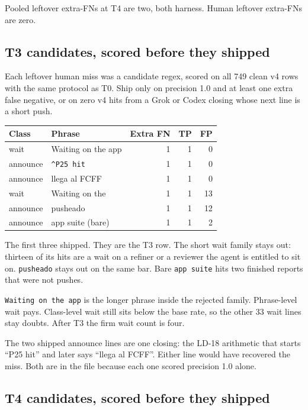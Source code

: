 Pooled leftover extra-FNs at T4 are two, both harness. Human leftover
extra-FNs are zero.

\subsection{T3 candidates, scored before they shipped}
\label{sec:t3wait}

Each leftover human miss was a candidate regex, scored on all 749
clean v4 rows with the same protocol as T0. Ship only on precision
1.0 and at least one extra false negative, or on zero v4 hits from a
Grok or Codex closing whose next line is a short push.

\begin{center}
{\small\begin{tabular}{llrrr}
\toprule
Class & Phrase & Extra FN & TP & FP \\
\midrule
wait & Waiting on the app & 1 & 1 & 0 \\
announce & \texttt{\^{}P25 hit} & 1 & 1 & 0 \\
announce & llega al FCFF & 1 & 1 & 0 \\
wait & Waiting on the & 1 & 1 & 13 \\
announce & pusheado & 1 & 1 & 12 \\
announce & app suite (bare) & 1 & 1 & 2 \\
\bottomrule
\end{tabular}}
\end{center}

The first three shipped. They are the T3 row. The short wait family
stays out: thirteen of its hits are a wait on a refiner or a
reviewer the agent is entitled to sit on. \texttt{pusheado} stays
out on the same bar. Bare \texttt{app suite} hits two finished
reports that were not pushes.

\texttt{Waiting on the app} is the longer phrase inside the rejected
family. Phrase-level wait pays. Class-level wait still sits below
the base rate, so the other 33 wait lines stay doubts. After T3 the
firm wait count is four.

The two shipped announce lines are one closing: the LD-18
arithmetic that starts ``P25 hit'' and later says ``llega al FCFF''.
Either line would have recovered the miss. Both are in the file
because each one scored precision 1.0 alone.


\subsection{T4 candidates, scored before they shipped}
\label{sec:t4cands}

